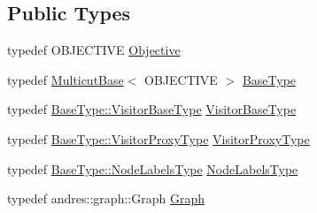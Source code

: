 \subsection*{Public Types}
\begin{DoxyCompactItemize}
\item 
typedef O\+B\+J\+E\+C\+T\+I\+V\+E \hyperlink{classnifty_1_1graph_1_1optimization_1_1multicut_1_1MulticutAndres_ac2d2044ef4dc45dbacdb3f34b001760f}{Objective}
\item 
typedef \hyperlink{classnifty_1_1graph_1_1optimization_1_1multicut_1_1MulticutBase}{Multicut\+Base}$<$ O\+B\+J\+E\+C\+T\+I\+V\+E $>$ \hyperlink{classnifty_1_1graph_1_1optimization_1_1multicut_1_1MulticutAndres_a075b7a01930fbfb2fa2834157c78bf89}{Base\+Type}
\item 
typedef \hyperlink{classnifty_1_1graph_1_1optimization_1_1common_1_1SolverBase_a5a14d64c70a9cc0eebc7d71d2b089f9b}{Base\+Type\+::\+Visitor\+Base\+Type} \hyperlink{classnifty_1_1graph_1_1optimization_1_1multicut_1_1MulticutAndres_a2d78bb58be29b7d46e9c653489a6d1de}{Visitor\+Base\+Type}
\item 
typedef \hyperlink{classnifty_1_1graph_1_1optimization_1_1common_1_1SolverBase_a58913ea9ab9232ff72608b710c1012d0}{Base\+Type\+::\+Visitor\+Proxy\+Type} \hyperlink{classnifty_1_1graph_1_1optimization_1_1multicut_1_1MulticutAndres_aa9bb57168c3d0c6cba6610d6a27f5b4e}{Visitor\+Proxy\+Type}
\item 
typedef \hyperlink{classnifty_1_1graph_1_1optimization_1_1common_1_1SolverBase_a6e4e465f3b6e039882669fcfb9714818}{Base\+Type\+::\+Node\+Labels\+Type} \hyperlink{classnifty_1_1graph_1_1optimization_1_1multicut_1_1MulticutAndres_aebe9bae6ca2760f72e19ec62504de209}{Node\+Labels\+Type}
\item 
typedef andres\+::graph\+::\+Graph \hyperlink{classnifty_1_1graph_1_1optimization_1_1multicut_1_1MulticutAndres_a975ce8ae05d1ef2a988656c5906616bb}{Graph}
\end{DoxyCompactItemize}
